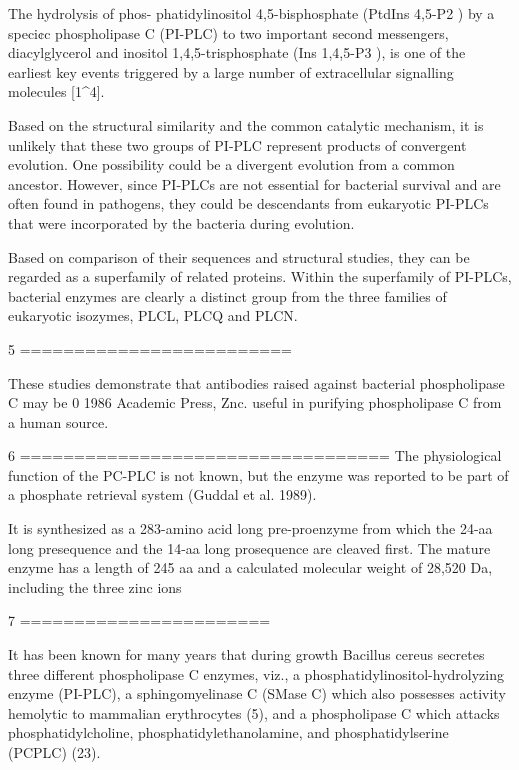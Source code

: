The hydrolysis of phos- phatidylinositol 4,5-bisphosphate (PtdIns 4,5-P2 ) by a speci¢c phospholipase C (PI-PLC) to two important second messengers, diacylglycerol and inositol 1,4,5-trisphosphate (Ins 1,4,5-P3 ), is one of the earliest key events triggered by a large number of extracellular signalling molecules [1^4].

 Based on the structural similarity and the common catalytic mechanism, it is unlikely that these two groups of PI-PLC represent products of convergent evolution. One possibility could be a divergent evolution from a common ancestor. However, since PI-PLCs are not essential for bacterial survival and are often found in pathogens, they could be descendants from eukaryotic PI-PLCs that were incorporated by the bacteria during evolution.


 Based on comparison of their sequences and structural studies, they can be regarded as a superfamily of related proteins. Within the superfamily of PI-PLCs, bacterial enzymes are clearly a distinct group from the three families of eukaryotic isozymes, PLCL, PLCQ and PLCN.



 5
 =========================

  These studies demonstrate that antibodies raised against bacterial phospholipase C may be 0 1986 Academic Press, Znc. useful in purifying phospholipase C from a human source.



 6
 ==================================
 The physiological function of the PC-PLC is not known, but the enzyme was reported to be part of a phosphate retrieval system (Guddal et al. 1989).

 It is synthesized as a 283-amino acid long pre-proenzyme from which the 24-aa long presequence and the 14-aa long prosequence are cleaved first. The mature enzyme has a length of 245 aa and a calculated molecular weight of 28,520 Da, including the three zinc ions




 7
 =======================

 It has been known for many years that during growth Bacillus cereus secretes three different phospholipase C enzymes, viz., a phosphatidylinositol-hydrolyzing enzyme (PI-PLC), a sphingomyelinase C (SMase C) which also possesses activity hemolytic to mammalian erythrocytes (5), and a phospholipase C which attacks phosphatidylcholine, phosphatidylethanolamine, and phosphatidylserine (PCPLC) (23).

